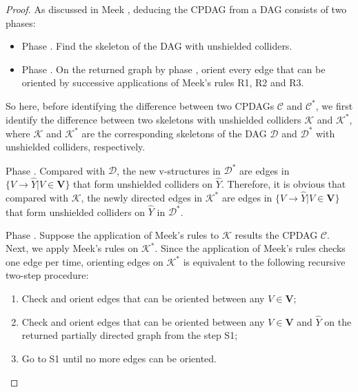 \documentclass{article} %
\begin{document}
\begin{proof} 
    As discussed in Meek \cite{meek1995causal}, deducing the CPDAG from a DAG consists of two phases: 
    \begin{itemize}
        \item Phase \uppercase\expandafter{}. Find the skeleton of the DAG with unshielded colliders.
        \item Phase \uppercase\expandafter{}. On the returned graph by phase \uppercase\expandafter{}, orient every edge that can be oriented by successive applications of Meek's rules R1, R2 and R3.
    \end{itemize}
     So here, before identifying the difference between two CPDAGs $\mathcal{C}$ and $\mathcal{C^{*}}$, we first identify the difference between two skeletons with unshielded colliders $\mathcal{K}$ and $\mathcal{K^{*}}$, where $\mathcal{K}$ and $\mathcal{K^{*}}$ are the corresponding skeletons of the DAG $\mathcal{D}$ and $\mathcal{D^{*}}$ with unshielded colliders, respectively. 
    
    Phase \uppercase\expandafter{}. Compared with $\mathcal{D}$, the new v-structures in $\mathcal{D^{*}}$ are edges in $\{V \rightarrow \hat{Y}|V \in \mathbf{V}\}$ that form unshielded colliders on $\hat{Y}$. Therefore, it is obvious that compared with $\mathcal{K}$, the newly directed edges in $\mathcal{K^{*}}$ are edges in $\{V \rightarrow \hat{Y}|V \in \mathbf{V}\}$ that form unshielded colliders on $\hat{Y}$ in $\mathcal{D^{*}}$.    
    
    Phase \uppercase\expandafter{}. Suppose the application of Meek's rules to $\mathcal{K}$ results the CPDAG $\mathcal{C}$.
    Next, we apply Meek's rules on $\mathcal{K^{*}}$. Since the application of Meek's rules checks one edge per time, orienting edges on $\mathcal{K^{*}}$ is equivalent to the following recursive two-step procedure: 
    \begin{enumerate}%
    \itemsep0em
        \item[S1.] Check and orient edges that can be oriented between any $V \in \mathbf{V}$;
        \item[S2.] Check and orient edges that can be oriented between any $V \in \mathbf{V}$ and $\hat{Y}$ on the returned partially directed graph from the step S1;
        \item[S3.] Go to S1 until no more edges can be oriented.
    \end{enumerate}
    

\end{proof}
\end{document}
